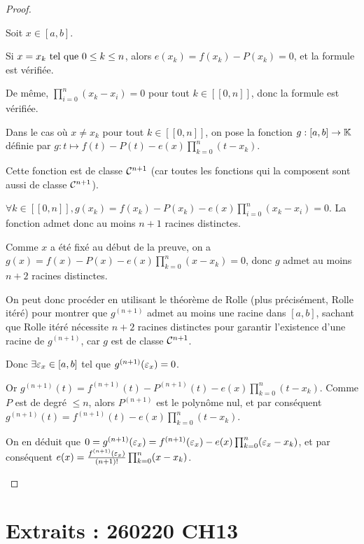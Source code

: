 \documentclass[12pt,a4paper]{report}
\begin{document}
\begin{proof}
    \begin{outline}
    \1 Soit $x \in [a,b]$.

    \1 Si $x = x_k \text{ tel que } 0 \le k \le n$, alors $e(x_k) = f(x_k) - P(x_k) = 0$, et la formule est vérifiée.

    \2 De même, $\prod_{i=0}^n (x_k - x_i) = 0$ pour tout $k \in [\![0,n]\!]$, donc la formule est vérifiée.

    \1 Dans le cas où $x \ne x_k$ pour tout $k \in [\![0,n]\!]$, on pose la fonction $g : [a,b] \to \mathbb{K}$ définie par $g : t \mapsto f(t) - P(t) - e(x) \prod_{k=0}^{n} (t-x_k)$.

    \2 Cette fonction est de classe $\mathcal{C}^{n+1}$ (car toutes les fonctions qui la composent sont aussi de classe $\mathcal{C}^{n+1}$).

    \2 $\forall k \in [\![0,n]\!], g(x_k) = f(x_k) - P(x_k) - e(x) \prod_{i=0}^{n} (x_k - x_i) = 0$. La fonction admet donc au moins $n+1$ racines distinctes.

    \2 Comme $x$ a été fixé au début de la preuve, on a $g(x) = f(x) - P(x) - e(x) \prod_{k=0}^{n} (x-x_k) = 0$, donc $g$ admet au moins $n+2$ racines distinctes.

    \2 On peut donc procéder en utilisant le théorème de Rolle (plus précisément, Rolle itéré) pour montrer que $g^{(n+1)}$ admet au moins une racine dans $[a,b]$, sachant que Rolle itéré nécessite $n+2$ racines distinctes pour garantir l'existence d'une racine de $g^{(n+1)}$, car $g$ est de classe $\mathcal{C}^{n+1}$.

    \2 Donc $\exists \varepsilon_x \in [a,b]$ tel que $g^{(n+1)}(\varepsilon_x) = 0$.

    \2 Or $g^{(n+1)}(t) = f^{(n+1)}(t) - P^{(n+1)}(t) - e(x) \prod_{k=0}^{n} (t-x_k)$. Comme $P$ est de degré $\le n$, alors $P^{(n+1)}$ est le polynôme nul, et par conséquent $g^{(n+1)}(t) = f^{(n+1)}(t) - e(x) \prod_{k=0}^{n} (t-x_k)$.

    \2 On en déduit que $0 = g^{(n+1)}(\varepsilon_x) = f^{(n+1)}(\varepsilon_x) - e(x) \prod_{k=0}^{n} (\varepsilon_x-x_k)$, et par conséquent $e(x) = \frac{f^{(n+1)}(\varepsilon_x)}{(n+1)!} \prod_{k=0}^{n} (x-x_k)$.
    \end{outline}
\end{proof}


\vspace{1em}


\section*{Extraits : 260220 CH13}
\end{document}
